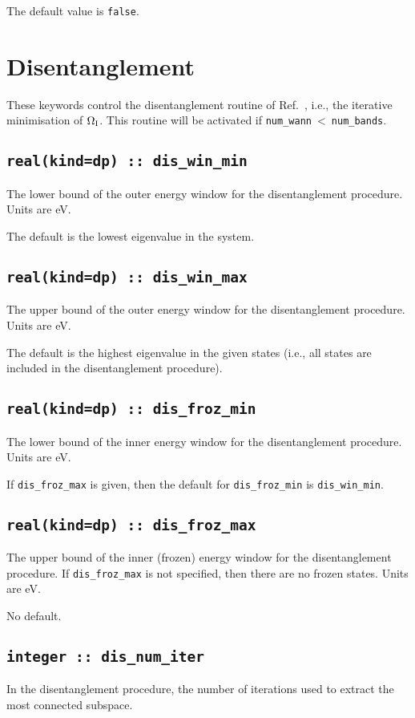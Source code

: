 The default value is \verb#false#.


\section{Disentanglement}
These keywords control the disentanglement routine of
Ref.~\cite{souza-prb01}, i.e., the iterative minimisation of $\Omega_{\mathrm{I}}$. This
routine will be activated if \verb#num_wann#$\:<\:$\verb#num_bands#.


\subsection[dis\_win\_min]{\tt real(kind=dp) :: dis\_win\_min}
The lower bound of the outer energy window for the disentanglement
procedure. Units are eV.

The default is the lowest eigenvalue in the system.

\subsection[dis\_win\_max]{\tt real(kind=dp) :: dis\_win\_max}
The upper bound of the outer energy window for the disentanglement
procedure. Units are eV.

The default is the highest eigenvalue in the given states (i.e., all states
are included in the disentanglement procedure).

\subsection[dis\_froz\_min]{\tt real(kind=dp) :: dis\_froz\_min}
The lower bound of the inner energy window for the disentanglement
procedure.  Units are eV.

If \verb#dis_froz_max# is given, then the default for
\verb#dis_froz_min# is \verb#dis_win_min#.


\subsection[dis\_froz\_max]{\tt real(kind=dp) :: dis\_froz\_max}
The upper bound of the inner (frozen) energy window for the
disentanglement procedure. If \verb#dis_froz_max# is not specified,
then there are no frozen states. Units are eV.

No default.

\subsection[dis\_num\_iter]{\tt integer :: dis\_num\_iter}
In the disentanglement procedure, the
number of iterations used to extract the most connected subspace.

